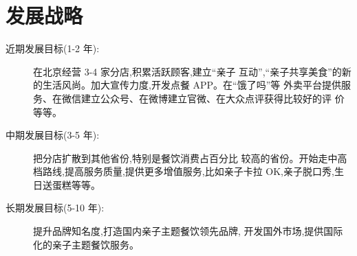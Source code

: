 \section{发展战略}
\begin{description}
\item [ 近期发展目标(1-2 年):] 在北京经营 3-4 家分店,积累活跃顾客,建立“亲子
互动”,“亲子共享美食”的新的生活风尚。加大宣传力度,开发点餐 APP。在“饿了吗”等
外卖平台提供服务、在微信建立公众号、在微博建立官微、在大众点评获得比较好的评
价等等。

\item [ 中期发展目标(3-5 年):]  把分店扩散到其他省份,特别是餐饮消费占百分比
较高的省份。开始走中高档路线,提高服务质量,提供更多增值服务,比如亲子卡拉
OK,亲子脱口秀,生日送蛋糕等等。

\item [ 长期发展目标(5-10 年):]  提升品牌知名度,打造国内亲子主题餐饮领先品牌,
开发国外市场,提供国际化的亲子主题餐饮服务。
\end{description}
